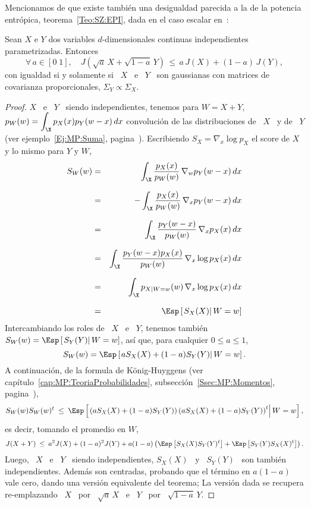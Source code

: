Mencionamos de que existe tambi\'en una desigualdad parecida a la de la potencia
entr\'opica,  teorema~\ref{Teo:SZ:EPI}, dada en  el caso  escalar en~\cite{Joh04,
  Bla65, Zam98, DemCov91, KagYu08}:
%
\begin{teorema}
\label{Teo:SZ:DesigualdadConvolucionalFisher}
%
  Sean  $X$  e  $Y$  dos variables  $d$-dimensionales  continuas  independientes
  parametrizadas.  Entonces
  \[
  \forall \, a \in [0 \;  1], \quad J\left( \sqrt{a} \, X + \sqrt{1-a} \, Y
  \right) \, \le \, a \, J(X) + (1-a) \, J(Y),
  \]
  con igualdad si y  solamente si \ $X$ \ e \ $Y$  \ son gaussianas con matrices
  de covarianza proporcionales, $\Sigma_Y \propto \Sigma_X$.
\end{teorema}
%
\begin{proof}
  $X$  \  e  \  $Y$  \  siendo  independientes,  tenemos  para  $W  =  X  +  Y$,
  $\displaystyle p_W(w)  = \int_\X p_X(x)  p_Y(w-x) \, dx$ convoluci\'on  de las
  distribuciones  de  \  $X$  \   y  de  \  $Y$  (ver  ejemplo~\ref{Ej:MP:Suma},
  pagina~\pageref{Ej:MP:Suma}).  Escribiendo $S_X =  \nabla_x \log p_X$ el score
  de $X$ y lo mismo para $Y$ y $W$,
  \begin{eqnarray*}
  S_W(w) & = & \int_\X \frac{p_X(x)}{p_W(w)} \, \nabla_w p_Y(w-x) \, dx\\[2.5mm]
  & = & - \int_\X \frac{p_X(x)}{p_W(w)} \, \nabla_x p_Y(w-x) \, dx\\[2.5mm]
  & = & \int_\X \frac{p_Y(w-x)}{p_W(w)} \, \nabla_x p_X(x) \, dx\\[2.5mm]
  & = & \int_\X \frac{p_Y(w-x) p_X(x)}{p_W(w)} \, \nabla_x \log p_X(x) \, dx\\[2.5mm]
  & = & \int_\X p_{X|W=w}(w) \, \nabla_x \log p_X(x) \, dx\\[2.5mm]
  & = & \Esp\left[ \left. S_X(X) \right| W = w \right]
  \end{eqnarray*}
  Intercambiando  los roles de  \ $X$  \ e  \ $Y$,  tenemos tambi\'en  $S_W(w) =
  \Esp\left[ \left. S_Y(Y) \right| W =  w \right]$, as\'i que, para cualquier $0
  \le a \le 1$,
  \[
  S_W(w) = \Esp\left[ \left. a S_X(X) + (1-a) S_Y(Y) \right| W = w \right].
  \]
  A    continuaci\'on,    de     la    formula    de    K\"onig-Huyggens    (ver
  cap\'itulo~\ref{cap:MP:TeoriaProbabilidades},
  subsecci\'on~\ref{Ssec:MP:Momentos}, pagina~\pageref{Ssec:MP:Momentos}),
  \[
  S_W(w) S_W(w)^t \: \le \:  \Esp\left[ \left. \left(a S_X(X) + (1-a) S_Y(Y)
      \right) \left(a S_X(X) + (1-a) S_Y(Y) \right)^t \right| W = w \right],
  \]
  es decir, tomando el promedio en $W$,
  \[
  J(X+Y) \: \le  \: a^2 J(X) + (1-a)^2 J(Y) +  a (1-a) \left( \Esp\left[
      S_X(X) S_Y(Y)^t \right] + \Esp\left[ S_Y(Y) S_X(X)^t \right] \right).
  \]
  Luego, \ $X$ \ e \ $Y$ \  siendo independientes, $S_X(X)$ \ y \ $S_Y(Y)$ \ son
  tambi\'en independientes. Adem\'as son centradas, probando que el t\'ermino en
  $a  (1-a)$ vale  cero, dando  una  versi\'on equivalente  del teorema;  La
  versi\'on dada se recupera re-emplazando \ $X$ \ por \ $\sqrt{a} \, X$ \ e \
  $Y$ \ por \ $\sqrt{1-a} \, Y$.


\end{proof}
